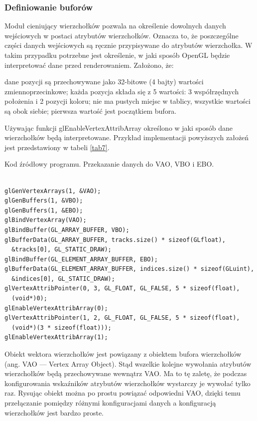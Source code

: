 \subsubsection{Definiowanie buforów}
Moduł cieniujący wierzchołków pozwala na określenie dowolnych danych wejściowych w postaci atrybutów wierzchołków. Oznacza to, że poszczególne części danych wejściowych są ręcznie przypisywane do atrybutów wierzchołka. W takim przypadku potrzebne jest określenie, w jaki sposób OpenGL będzie interpretować dane przed renderowaniem. Założono, że:
\begin{itemize}
\itemi dane pozycji są przechowywane jako 32-bitowe (4 bajty) wartości zmiennoprzecinkowe;
\itemi każda pozycja składa się z 5 wartości: 3 współrzędnych położenia i 2 pozycji koloru;
\itemi nie ma pustych miejsc w tablicy, wszystkie wartości są obok siebie;
\itemi pierwsza wartość jest początkiem bufora.
\end{itemize}
Używając funkcji glEnableVertexAttribArray określono w jaki sposób dane wierzchołków będą interpretowane. Przykład implementacji powyższych założeń jest przedstawiony w tabeli \ref{tab7}.
\begin{table}[H]
\caption{Kod źródłowy programu. Przekazanie danych do VAO, VBO i EBO.}
\label{tab7}
\begin{lstlisting}[frame=single]  % Start your code-block

glGenVertexArrays(1, &VAO);
glGenBuffers(1, &VBO);
glGenBuffers(1, &EBO);
glBindVertexArray(VAO);
glBindBuffer(GL_ARRAY_BUFFER, VBO);
glBufferData(GL_ARRAY_BUFFER, tracks.size() * sizeof(GLfloat),
  &tracks[0], GL_STATIC_DRAW);
glBindBuffer(GL_ELEMENT_ARRAY_BUFFER, EBO);
glBufferData(GL_ELEMENT_ARRAY_BUFFER, indices.size() * sizeof(GLuint),
  &indices[0], GL_STATIC_DRAW);
glVertexAttribPointer(0, 3, GL_FLOAT, GL_FALSE, 5 * sizeof(float),
  (void*)0);
glEnableVertexAttribArray(0);
glVertexAttribPointer(1, 2, GL_FLOAT, GL_FALSE, 5 * sizeof(float),
  (void*)(3 * sizeof(float)));
glEnableVertexAttribArray(1);
\end{lstlisting}
\end{table}

Obiekt wektora wierzchołków jest powiązany z obiektem bufora wierzchołków (ang. VAO --- Vertex Array Object). Stąd wszelkie kolejne wywołania atrybutów wierzchołków będą przechowywane wewnątrz VAO. Ma to tę zaletę, że podczas konfigurowania wskaźników atrybutów wierzchołków wystarczy je wywołać tylko raz. Rysując obiekt można po prostu powiązać odpowiedni VAO, dzięki temu przełączanie pomiędzy różnymi konfiguracjami danych a konfiguracją wierzchołków jest bardzo proste.

